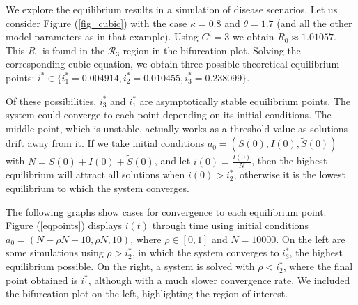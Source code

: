 \documentclass[sn-basic]{sn-jnl}%
\theoremstyle{thmstyleone}%
\theoremstyle{thmstyletwo}%
\theoremstyle{thmstylethree}%
\newcommand{\wS}{\widetilde{S}}
\begin{document}
We explore the equilibrium results in a simulation of disease scenarios. Let us consider Figure (\ref{fig_cubic}) with the case $\kappa = 0.8$ and $\theta =1.7$ (and all the other model parameters as in that example). Using $C^i=3$ we obtain $R_0 \approx 1.01057$. This $R_0$ is found in the $\mathcal{R}_3$ region in the bifurcation plot. Solving the corresponding cubic equation, we obtain three possible theoretical equilibrium points: $i^* \in \{i_1^* = 0.004914, i_2^* = 0.010455, i_3^* = 0.238099\}$.

Of these possibilities, $i_3^*$ and $i_1^*$  are asymptotically stable equilibrium points. The system could converge to each point depending on its initial conditions. The middle point, which is unstable, actually works as a threshold value as solutions drift away from it. If we take initial conditions $a_0 = (S(0),I(0),\wS(0))$ with $N= S(0) + I(0) + \wS(0)$, and let $i(0) = \frac{I(0)}{N}$, then the highest equilibrium will attract all solutions when $i(0)>i_2^*$, otherwise it is the lowest equilibrium to which the system converges.

The following graphs show cases for convergence to each equilibrium point. Figure (\ref{eqpoints}) displays $i(t)$ through time using initial conditions $a_0 = (N- \rho N - 10, \rho N, 10)$, where $\rho \in [0,1]$ and $N=10000$. On the left are some simulations using $\rho>i_2^*$, in which the system converges to $i_3^*$, the highest equilibrium possible. On the right, a system is solved with $\rho<i_2^*$, where the final point obtained is $i_1^*$, although with a much slower convergence rate. We included the bifurcation plot on the left, highlighting the region of interest.
\end{document}
